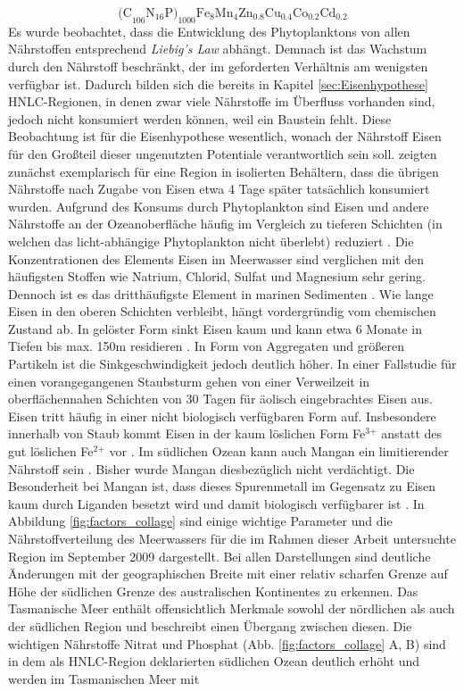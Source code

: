 \documentclass[12pt,a4paper,onecolumn,headheight=30pt]{scrartcl}
\begin{document}
\begin{equation}
\text{(C}_{106} \text{N}_{16} \text{P)}_{1000} \text{Fe}_8\text{Mn}_4\text{Zn}_{0.8}\text{Cu}_{0.4}\text{Co}_{0.2} \text{Cd}_{0.2} \label{eq:stochio}
\end{equation}
Es wurde beobachtet, dass die Entwicklung des Phytoplanktons von allen Nährstoffen entsprechend \textit{Liebig's Law} abhängt. Demnach ist das Wachstum durch den Nährstoff beschränkt, der im geforderten Verhältnis am wenigsten verfügbar ist. Dadurch bilden sich die bereits in Kapitel \ref{sec:Eisenhypothese} HNLC-Regionen, in denen zwar viele Nährstoffe im Überfluss vorhanden sind, jedoch nicht konsumiert werden können, weil ein Baustein fehlt. Diese Beobachtung ist für die Eisenhypothese wesentlich, wonach der Nährstoff Eisen für den Großteil dieser ungenutzten Potentiale verantwortlich sein soll. \citet{Martin.1988} zeigten zunächst exemplarisch für eine Region in isolierten Behältern, dass die übrigen Nährstoffe nach Zugabe von Eisen etwa 4 Tage später tatsächlich konsumiert wurden. Aufgrund des Konsums durch Phytoplankton sind Eisen und andere Nährstoffe an der Ozeanoberfläche häufig im Vergleich zu tieferen Schichten (in welchen das licht-abhängige Phytoplankton nicht überlebt) reduziert \citep{Martin.1990}. Die Konzentrationen des Elements Eisen im Meerwasser sind verglichen mit den häufigsten Stoffen wie Natrium, Chlorid, Sulfat und Magnesium sehr gering. Dennoch ist es das dritthäufigste Element in marinen Sedimenten \citep{Emerson.2009}. Wie lange Eisen in den oberen Schichten verbleibt, hängt vordergründig vom chemischen Zustand ab. In gelöster Form sinkt Eisen kaum und kann etwa 6 Monate in Tiefen bis max. 150m residieren \citep{Hayes.2015}. In Form von Aggregaten und größeren Partikeln ist die Sinkgeschwindigkeit jedoch deutlich höher. In einer Fallstudie für einen vorangegangenen Staubsturm gehen \citet{Boyd.2010} von einer Verweilzeit in oberflächennahen Schichten von 30 Tagen für äolisch eingebrachtes Eisen aus. Eisen tritt häufig in einer nicht biologisch verfügbaren Form auf. Insbesondere innerhalb von Staub kommt Eisen in der kaum löslichen Form Fe$^\text{3+}$ anstatt des gut löslichen Fe$^\text{2+}$ vor \citep{Reynolds.2014}. Im südlichen Ozean kann auch Mangan ein limitierender Nährstoff sein \citep{Browning.2021}. Bisher wurde Mangan diesbezüglich nicht verdächtigt. Die Besonderheit bei Mangan ist, dass dieses Spurenmetall im Gegensatz zu Eisen kaum durch Liganden besetzt wird und damit biologisch verfügbarer ist \citep{Emerson.2009}. In Abbildung \ref{fig:factors_collage} sind einige wichtige Parameter und die Nährstoffverteilung des Meerwassers für die im Rahmen dieser Arbeit untersuchte Region im September 2009 dargestellt. Bei allen Darstellungen sind deutliche Änderungen mit der geographischen Breite mit einer relativ scharfen Grenze auf Höhe der südlichen Grenze des australischen Kontinentes zu erkennen. Das Tasmanische Meer enthält offensichtlich Merkmale sowohl der nördlichen als auch der südlichen Region und beschreibt einen Übergang zwischen diesen. Die wichtigen Nährstoffe Nitrat und Phosphat (Abb. \ref{fig:factors_collage} A, B) sind in dem als HNLC-Region deklarierten südlichen Ozean deutlich erhöht und werden im Tasmanischen Meer mit 
\end{document}
